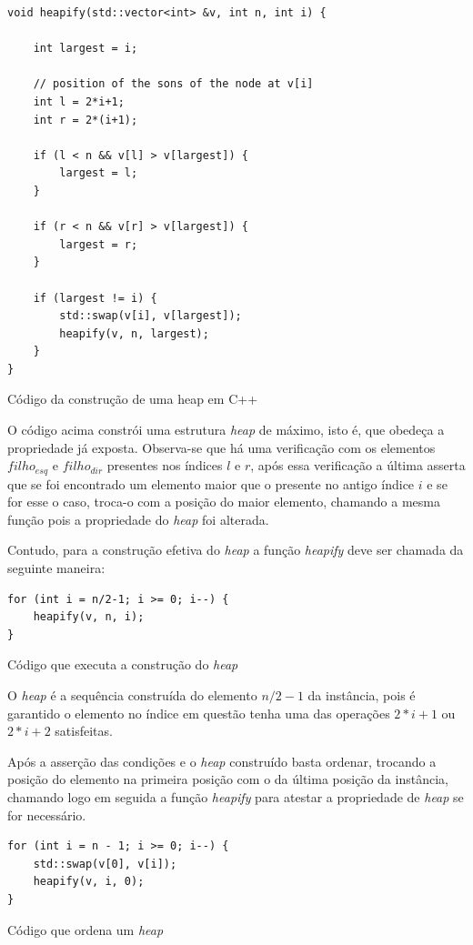 \documentclass[a4paper, 12pt]{report}
\begin{document}
\begin{listing}[H]
\begin{verbatim}
void heapify(std::vector<int> &v, int n, int i) {

    int largest = i;

    // position of the sons of the node at v[i]
    int l = 2*i+1;
    int r = 2*(i+1);

    if (l < n && v[l] > v[largest]) {
        largest = l;
    }

    if (r < n && v[r] > v[largest]) {
        largest = r;
    }

    if (largest != i) {
        std::swap(v[i], v[largest]);
        heapify(v, n, largest);
    }
}
\end{verbatim}
\caption{Código da construção de uma heap em C++}
\end{listing}

O código acima constrói uma estrutura \emph{heap} de máximo, isto é, que obedeça a
propriedade já exposta. Observa-se que há uma verificação com os elementos
$filho_{esq}$ e $filho_{dir}$ presentes nos índices $l$ e $r$, após essa
verificação a última asserta que se foi encontrado um elemento maior que o
presente no antigo índice $i$ e se for esse o caso, troca-o com a posição do
maior elemento, chamando a mesma função pois a propriedade do \emph{heap} foi
alterada.

Contudo, para a construção efetiva do \emph{heap} a função \emph{heapify} deve ser
chamada da seguinte maneira:

\begin{listing}[H]
\begin{verbatim}
for (int i = n/2-1; i >= 0; i--) {
    heapify(v, n, i);
}
\end{verbatim}
\caption{Código que executa a construção do \emph{heap}}
\end{listing}

O \emph{heap} é a sequência construída do elemento $n/2-1$ da instância, pois é
garantido o elemento no índice em questão tenha uma das operações $2*i+1$ ou
 $2*i+2$ satisfeitas.

Após a asserção das condições e o \emph{heap} construído basta ordenar, trocando a
posição do elemento na primeira posição com o da última posição da instância,
chamando logo em seguida a função \emph{heapify} para atestar a propriedade de
\emph{heap} se for necessário.

\begin{listing}[H]
\begin{verbatim}
for (int i = n - 1; i >= 0; i--) {
    std::swap(v[0], v[i]);
    heapify(v, i, 0);
}
\end{verbatim}
\caption{Código que ordena um \emph{heap}}
\end{listing}
\end{document}
